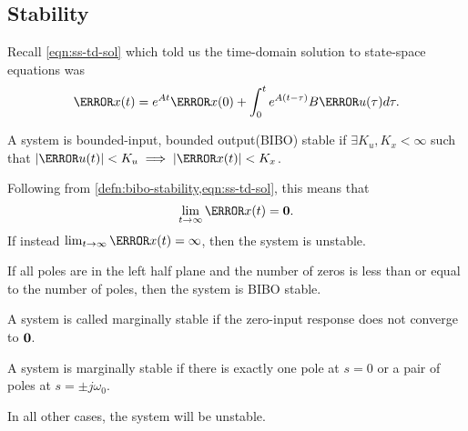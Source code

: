 \subsection{Stability}
Recall \cref{eqn:ss-td-sol} which told us the time-domain solution to state-space equations was
\[
  \V{x}(t) = e^{At}\V{x}(0) + \int_{0}^{t}e^{A(t-\tau)}B\V{u}(\tau)d\tau.
\]
\begin{definition}
  A system is bounded-input, bounded output(BIBO) stable if $\exists K_u, K_x < \infty$ such that $|\V{u}(t)| < K_{u} \implies |\V{x}(t)| < K_x$.
  \label{defn:bibo-stability}
\end{definition}
Following from \cref{defn:bibo-stability,eqn:ss-td-sol}, this means that
\[
  \lim_{t\to\infty}\V{x}(t) = \bs{0}.
\]
If instead $\lim_{t\to\infty}\V{x}(t) = \infty$, then the system is unstable.
\begin{theorem}
  If all poles are in the left half plane and the number of zeros is less than or equal to the number of poles, then the system is BIBO stable.
  \label{thm:bibo-stability}
\end{theorem}
\begin{definition}
  A system is called marginally stable if the zero-input response does not converge to $\boldsymbol{0}$.
  \label{defn:marginal-stability}
\end{definition}
\begin{theorem}
  A system is marginally stable if there is exactly one pole at $s=0$ or a pair of poles at $s=\pm j\omega_0$.
  \label{thm:marginal-stability}
\end{theorem}
In all other cases, the system will be unstable.
